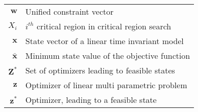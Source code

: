 \begin{scriptsize}
\begin{tabularx}{\textwidth}{r|X}
$\textbf{w}$                & Unified constraint vector \\
$X_i$                         & $i^{th}$ critical region in critical region search\\
$\textbf{x}$											& State vector of a linear time invariant model\\
$\bar{\textbf{x}}$											& Minimum state value of the objective function\\
$\textbf{Z}^*$              & Set of optimizers leading to feasible states\\
$\textbf{z}$											& Optimizer of linear multi parametric problem\\
$\textbf{z}^*$											& Optimizer, leading to a feasible state\\

\end{tabularx}
\end{scriptsize}
